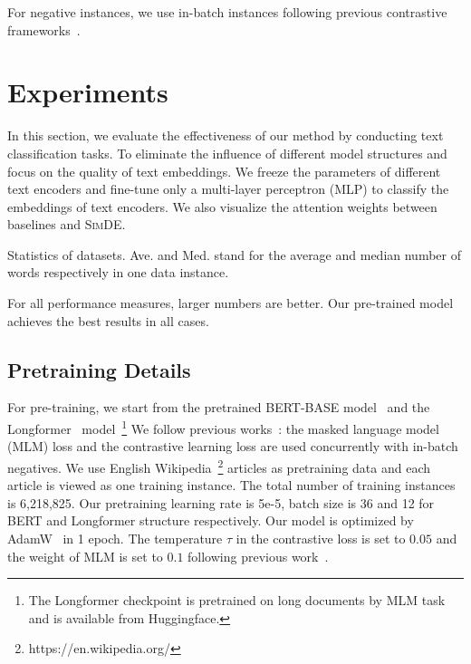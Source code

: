 \documentclass[11pt]{article}
\newcommand{\our}{\mbox{\textsc{SimDE}}}
\begin{document}
For negative instances, we use in-batch instances following previous contrastive frameworks~\cite{Gao2021SimCSESC, Li2022UCTopicUC}.



\section{Experiments}

\label{sec:experiments}
In this section, we evaluate the effectiveness of our method by conducting text classification tasks. 
To eliminate the influence of different model structures and focus on the quality of text embeddings. 
We freeze the parameters of different text encoders and fine-tune only a multi-layer perceptron (MLP) to classify the embeddings of text encoders.
We also visualize the attention weights between baselines and \our.

\begin{table}[t]
\centering
    
    \caption{Statistics of datasets. Ave. and Med. stand for the average and median number of words respectively in one data instance.}
    \label{dataset}
\end{table}

\begin{table}
    \centering
    
    \caption{For all performance measures, larger numbers are better. Our pre-trained model achieves the best results in all cases.}
    \vspace{-3mm}
    \label{results}
\end{table}

\subsection{Pretraining Details}
For pre-training, we start from the pretrained BERT-BASE model~\cite{Devlin2019BERTPO} and the Longformer~\cite{Beltagy2020LongformerTL} model~\footnote{The Longformer checkpoint is pretrained on long documents by MLM task and is available from Huggingface.} 
We follow previous works~\cite{Gao2021SimCSESC, Li2022UCTopicUC}: the masked language model (MLM) loss and the contrastive learning loss are used concurrently with in-batch negatives. 
We use English Wikipedia~\footnote{https://en.wikipedia.org/} articles as pretraining data and each article is viewed as one training instance. 
The total number of training instances is 6,218,825. 
Our pretraining learning rate is 5e-5, batch size is 36 and 12 for BERT and Longformer structure respectively. Our model is optimized by AdamW~\cite{Kingma2014AdamAM} in 1 epoch. 
The temperature $\tau$ in the contrastive loss is set to $0.05$ and the weight of MLM is set to $0.1$ following previous work~\cite{Gao2021SimCSESC}.
\end{document}
